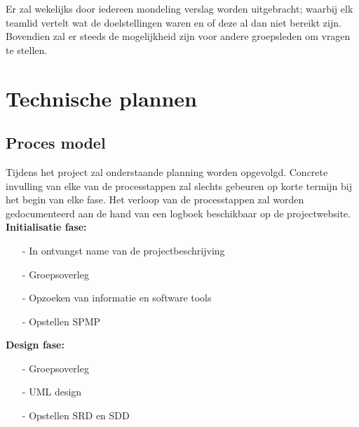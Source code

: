 \documentclass{article}
\begin{document}
Er zal wekelijks door iedereen mondeling verslag worden uitgebracht; waarbij elk teamlid vertelt wat de doelstellingen waren en of deze al dan niet bereikt zijn. Bovendien zal er steeds de mogelijkheid zijn voor andere groepsleden om vragen te stellen.

\newpage
\section{Technische plannen}

\subsection{Proces model}

Tijdens het project zal onderstaande planning worden opgevolgd. Concrete invulling van elke van de processtappen zal slechts gebeuren op korte termijn bij het begin van elke fase. Het verloop van de processtappen zal worden gedocumenteerd aan de hand van een logboek beschikbaar op de
projectwebsite. \\[3mm]

\textbf{Initialisatie fase:}
\begin{itemize}
\item[-] In ontvangst name van de projectbeschrijving\\[-5mm]
\item[-] Groepsoverleg\\[-5mm]
\item[-] Opzoeken van informatie en software tools\\[-5mm]
\item[-] Opstellen SPMP\\[-5mm]
\end{itemize}


\textbf{Design fase:}
\begin{itemize}
\item[-]Groepsoverleg\\[-5mm]
\item[-]UML design\\[-5mm]
\item[-]Opstellen SRD en SDD\\[-5mm]
\end{itemize}
\end{document}
